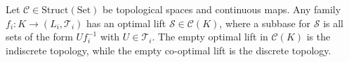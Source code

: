 Let $\mathcal{C} \in \text{Struct}(\text{Set})$ be topological spaces and continuous maps. Any family $f_i: K \to (L_i, \mathcal{T}_i)$ has an optimal lift $\mathcal{S} \in \mathcal{C}(K)$, where a subbase for $\mathcal{S}$ is all sets of the form $U f_i^{-1}$ with $U \in \mathcal{T}_i$. The empty optimal lift in $\mathcal{C}(K)$ is the indiscrete topology, while the empty co-optimal lift is the discrete topology.
